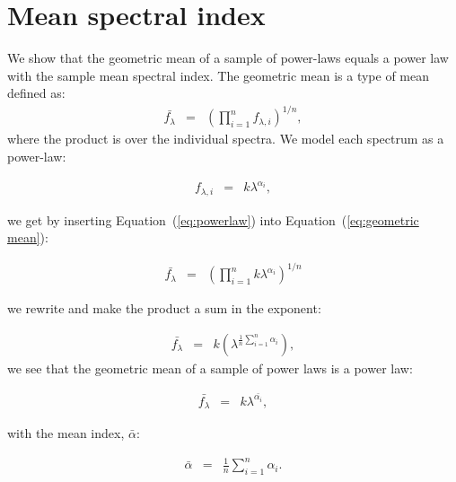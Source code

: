 \documentclass{aa}    %
\newcommand{\Eq}[1]{Equation~(\ref{eq:#1})}
\newcommand{\eq}[1]{\Eq{#1}}
\newcommand{\eqlabel}[1]{\label{eq:#1}}
\newcommand{\sectlabel}[1]{\label{sect:#1}}
\begin{document}






\appendix

\section{Mean spectral index}  \sectlabel{math} \label{math}


We show that the geometric mean of a sample of power-laws equals a power law
with the sample mean spectral index. The geometric mean is a type of mean
defined as:
\begin{eqnarray}\eqlabel{geometric mean}
\bar{f_{\lambda}} &=&  \left( \prod_{i=1}^n f_{\lambda, i} \right) ^{1/n},
\end{eqnarray}
where the product is over the individual spectra. We model each spectrum as a
power-law:

\begin{eqnarray}\eqlabel{powerlaw}
f_{\lambda, i} &=&  k \lambda ^{\alpha_{i}},
\end{eqnarray}

 we get by inserting \eq{powerlaw} into \eq{geometric mean}:
 
 \begin{eqnarray}\eqlabel{deriv1}
 \bar{f_{\lambda}} &=&  \left( \prod_{i=1}^n k \lambda ^{\alpha_{i}}\right)
^{1/n}
 \end{eqnarray}

we rewrite and make the product a sum in the exponent:

 \begin{eqnarray}\eqlabel{deriv2}
 \bar{f_{\lambda}} &=&  k \left( \lambda ^{ \frac{1}{n} \sum_{i=1}^n \alpha_{i} 
}\right) ,
 \end{eqnarray}
we see that the geometric mean of a sample of power laws is a power law:

 \begin{eqnarray}\eqlabel{deriv3}
 \bar{f_{\lambda}} &=&  k \lambda ^{ \bar{\alpha_{i} }},
 \end{eqnarray}

with the mean index, $\bar{\alpha}$:

 \begin{eqnarray}\eqlabel{mean}
 \bar{\alpha} &=&  \frac{1}{n} \sum_{i=1}^n \alpha_{i} .
 \end{eqnarray}
\end{document}
